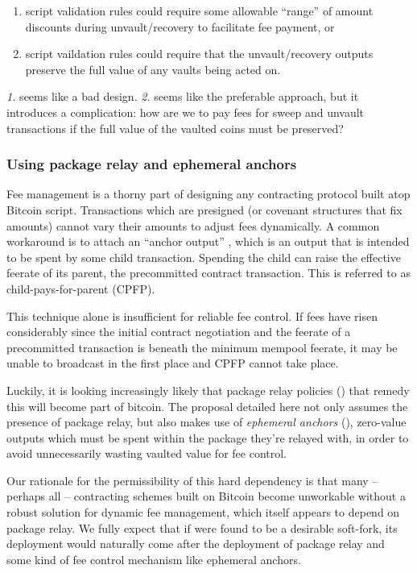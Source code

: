 \documentclass[10pt]{article}
\begin{document}
\begin{enumerate}
  \item script validation rules could require some allowable ``range'' of
    amount discounts during unvault/recovery to facilitate fee payment, or

  \item script vaildation rules could require that the unvault/recovery
    outputs preserve the full value of any vaults being acted on. 

\end{enumerate}
\emph{1.} seems like a bad design. \emph{2.} seems like the preferable approach, but it
introduces a complication: how are we to pay fees for sweep and
unvault transactions if the full value of the vaulted coins must be preserved?

\subsubsection*{Using package relay and ephemeral anchors}

Fee management is a thorny part of designing any contracting protocol built atop
Bitcoin script. Transactions which are presigned (or covenant structures that fix
amounts) cannot vary their amounts to adjust fees dynamically. A common workaround is
to attach an ``anchor output'' \cite{OptechAnchors}, which is an output that is
intended to be spent by some child transaction. Spending the child can raise the
effective feerate of its parent, the precommitted contract transaction. This is
referred to as child-pays-for-parent (CPFP).

This technique alone is insufficient for reliable fee control. If fees have risen
considerably since the initial contract negotiation and the feerate of a precommitted
transaction is beneath the minimum mempool feerate, it may be unable to broadcast in
the first place and CPFP cannot take place.

Luckily, it is looking increasingly likely that package relay policies
(\cite{OptechPkgRelay}) that remedy this will become part of bitcoin. The \opv{}
proposal detailed here not only assumes the presence of package relay, but also makes
use of \emph{ephemeral anchors} (\cite{Anchors}), zero-value outputs which must be 
spent within the package they're relayed with, in order to avoid unnecessarily wasting
vaulted value for fee control.

Our rationale for the permissibility of this hard dependency is that many -- perhaps
all -- contracting schemes built on Bitcoin become unworkable without a robust solution
for dynamic fee management, which itself appears to depend on package relay. We fully
expect that if \opv{} were found to be a desirable soft-fork, its deployment would
naturally come after the deployment of package relay and some kind of fee control
mechanism like ephemeral anchors.
\end{document}
